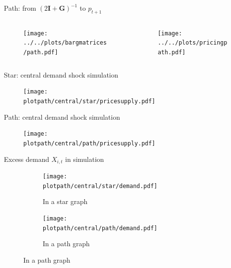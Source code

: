 \documentclass{beamer}
\newcommand{\matr}[1]{\bm{#1}}
\newcommand{\I}{\matr{I}}
\newcommand{\G}{\matr{G}}
\newcommand{\plotpath}{../../plots}
\begin{document}
\begin{frame} {Path: from $(2\I + \G)^{-1}$ to $p_{t+1}$ }
    \begin{columns}
        \begin{column}{.47\textwidth}
            \begin{figure}
                \texttt{[image: ../../plots/bargmatrices/path.pdf]}
            \end{figure}
        \end{column}
        \begin{column}{.47\textwidth}
            \begin{figure}
                \texttt{[image: ../../plots/pricingpath.pdf]}
            \end{figure}
        \end{column}
    \end{columns}
\end{frame}

\begin{frame}{Star: central demand shock simulation}
    \begin{figure}[H]
        \centering
        \texttt{[image: \\plotpath/central/star/pricesupply.pdf]}
    \end{figure}

\end{frame}

\begin{frame} {Path: central demand shock simulation}
    \begin{figure}[H]
        \centering
        \texttt{[image: \\plotpath/central/path/pricesupply.pdf]}
    \end{figure}
\end{frame}

\begin{frame} {Excess demand $X_{i, t}$ in simulation}
    \begin{center}
        \begin{figure}[H]
            \begin{subfigure}{0.475\textwidth}
                \centering
                \texttt{[image: \\plotpath/central/star/demand.pdf]}
                \caption{In a star graph} \label{fig:demandshock_star}
            \end{subfigure} \hfill
            \begin{subfigure}{0.475\textwidth}
                \centering
                \texttt{[image: \\plotpath/central/path/demand.pdf]}
                \caption{In a path graph} \label{fig:demandshock_path}
            \end{subfigure}
        \end{figure}
    \end{center}
\end{frame}
\end{document}
